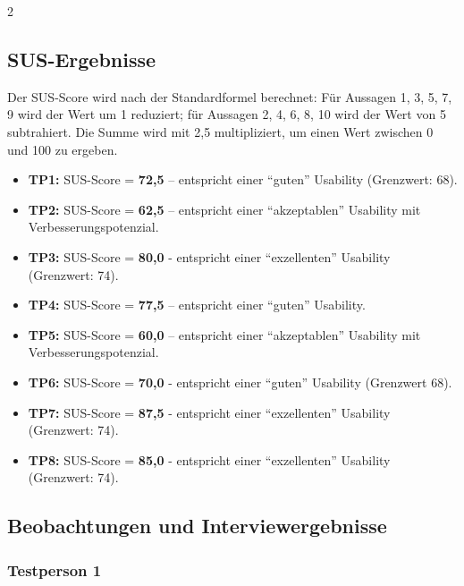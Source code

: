 \begin{multicols}{2}

\subsection{SUS-Ergebnisse}

Der SUS-Score wird nach der Standardformel berechnet:
Für Aussagen 1, 3, 5, 7, 9 wird der Wert um 1 reduziert;
für Aussagen 2, 4, 6, 8, 10 wird der Wert von 5 subtrahiert.
Die Summe wird mit 2{,}5 multipliziert, um einen Wert zwischen 0 und 100 zu ergeben.

\begin{itemize}
  \item \textbf{TP1:} SUS-Score = \textbf{72{,}5} –
        entspricht einer \enquote{guten} Usability (Grenzwert: 68).
  \item \textbf{TP2:} SUS-Score = \textbf{62{,}5} –
        entspricht einer \enquote{akzeptablen} Usability mit
        Verbesserungspotenzial.
  \item \textbf{TP3:} SUS-Score = \textbf{80{,}0} -
        entspricht einer \enquote{exzellenten} Usability (Grenzwert: 74).
  \item \textbf{TP4:} SUS-Score = \textbf{77{,}5} –
        entspricht einer \enquote{guten} Usability.
  \item \textbf{TP5:} SUS-Score = \textbf{60{,}0} –
        entspricht einer \enquote{akzeptablen} Usability mit Verbesserungspotenzial.
  \item \textbf{TP6:} SUS-Score = \textbf{70{,}0} -
        entspricht einer \enquote{guten} Usability (Grenzwert 68).
          \item \textbf{TP7:} SUS-Score = \textbf{87{,}5} -
        entspricht einer \enquote{exzellenten} Usability (Grenzwert: 74).
          \item \textbf{TP8:} SUS-Score = \textbf{85{,}0} -
        entspricht einer \enquote{exzellenten} Usability (Grenzwert: 74).
\end{itemize}

\subsection{Beobachtungen und Interviewergebnisse}

\subsubsection*{Testperson 1}


\end{multicols}
